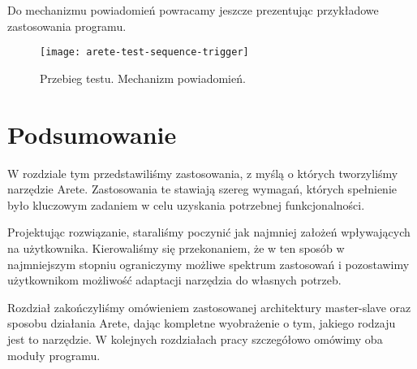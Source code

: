 \documentclass[00-praca-magisterska.tex]{subfiles}
\begin{document}
Do mechanizmu powiadomień powracamy jeszcze prezentując przykładowe
zastosowania programu.

\begin{figure}
\begin{center}
\leavevmode
\texttt{[image: arete-test-sequence-trigger]}
\end{center}
\caption{Przebieg testu. Mechanizm powiadomień.}
\label{fig:arete-test-seq-trigger}
\end{figure}

\section{Podsumowanie}

W rozdziale tym przedstawiliśmy zastosowania, z myślą o których tworzyliśmy
narzędzie Arete. Zastosowania te stawiają szereg wymagań, których spełnienie
było kluczowym zadaniem w celu uzyskania potrzebnej funkcjonalności.

Projektując rozwiązanie, staraliśmy poczynić jak najmniej założeń
wpływających na użytkownika. Kierowaliśmy się przekonaniem, że w ten sposób w
najmniejszym stopniu ograniczymy możliwe spektrum zastosowań i pozostawimy
użytkownikom możliwość adaptacji narzędzia do własnych potrzeb.

Rozdział zakończyliśmy omówieniem zastosowanej architektury master-slave oraz
sposobu działania Arete, dając kompletne wyobrażenie o tym, jakiego rodzaju
jest to narzędzie. W kolejnych rozdziałach pracy szczegółowo omówimy oba moduły
programu.
\end{document}
